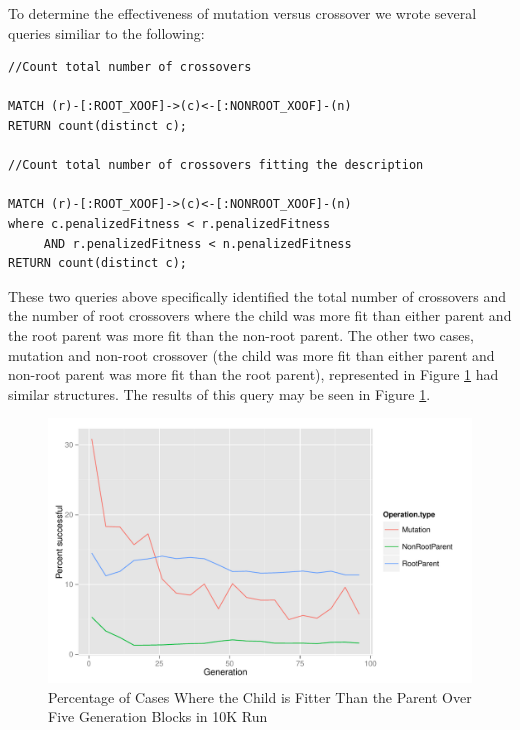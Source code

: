 \documentclass[12pt]{article}
\begin{document}
To determine the effectiveness of mutation versus crossover we wrote several queries similiar to the following:

\begin{verbatim}
//Count total number of crossovers

MATCH (r)-[:ROOT_XOOF]->(c)<-[:NONROOT_XOOF]-(n)
RETURN count(distinct c);

//Count total number of crossovers fitting the description

MATCH (r)-[:ROOT_XOOF]->(c)<-[:NONROOT_XOOF]-(n)
where c.penalizedFitness < r.penalizedFitness 
     AND r.penalizedFitness < n.penalizedFitness
RETURN count(distinct c);

\end{verbatim}

These two queries above specifically identified the total number of crossovers and the number of root crossovers where the child was more fit than either parent and the root parent was more fit than the non-root parent. The other two cases, mutation and non-root crossover (the child was more fit than either parent and non-root parent was more fit than the root parent), represented in Figure \ref{fig:improvedFitness} had similar structures. The results of this query may be seen in Figure \ref{fig:improvedFitness}.

\begin{figure}[tb]
 \centering
 \includegraphics[height=0.68\textwidth]{Blocked_success_percentages}
 \caption{Percentage of Cases Where the Child is Fitter Than the Parent Over Five Generation Blocks in 10K Run}
 \label{fig:improvedFitness}
\end{figure}
\end{document}
